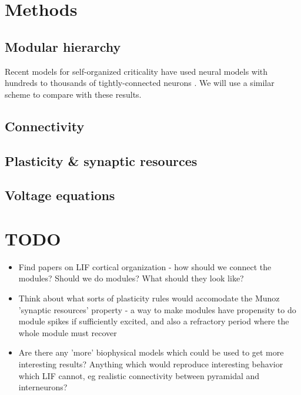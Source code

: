 \documentclass[a4paper, 12pt]{article}
\begin{document}
\section*{Methods}

\subsection*{Modular hierarchy}
Recent models for self-organized criticality have used neural models with hundreds to thousands of tightly-connected neurons \cite{munozlg, rubinov}. We will use a similar scheme to compare with these results.\\

\subsection*{Connectivity}
\subsection*{Plasticity \& synaptic resources}
\subsection*{Voltage equations}

\section*{TODO}
\begin{itemize}
\item Find papers on LIF cortical organization - how should we connect the modules? Should we do modules? What should they look like?
\item Think about what sorts of plasticity rules would accomodate the Munoz 'synaptic resources' property - a way to make modules have propensity to do module spikes if sufficiently excited, and also a refractory period where the whole module must recover
\item Are there any 'more' biophysical models which could be used to get more interesting results? Anything which would reproduce interesting behavior which LIF cannot, eg realistic connectivity between pyramidal and interneurons?
\end{itemize}
\end{document}
